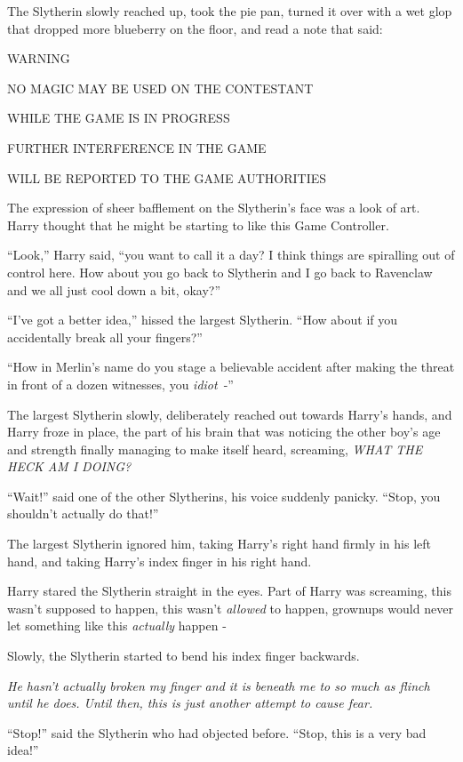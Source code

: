 The Slytherin slowly reached up, took the pie pan, turned it over with a wet glop that dropped more blueberry on the floor, and read a note that said:

WARNING

NO MAGIC MAY BE USED ON THE CONTESTANT

WHILE THE GAME IS IN PROGRESS

FURTHER INTERFERENCE IN THE GAME

WILL BE REPORTED TO THE GAME AUTHORITIES

The expression of sheer bafflement on the Slytherin's face was a look of art. Harry thought that he might be starting to like this Game Controller.

``Look,'' Harry said, ``you want to call it a day? I think things are spiralling out of control here. How about you go back to Slytherin and I go back to Ravenclaw and we all just cool down a bit, okay?''

``I've got a better idea,'' hissed the largest Slytherin. ``How about if you accidentally break all your fingers?''

``How in Merlin's name do you stage a believable accident after making the threat in front of a dozen witnesses, you \emph{idiot}~-''

The largest Slytherin slowly, deliberately reached out towards Harry's hands, and Harry froze in place, the part of his brain that was noticing the other boy's age and strength finally managing to make itself heard, screaming, \emph{WHAT THE HECK AM I DOING?}

``Wait!'' said one of the other Slytherins, his voice suddenly panicky. ``Stop, you shouldn't actually do that!''

The largest Slytherin ignored him, taking Harry's right hand firmly in his left hand, and taking Harry's index finger in his right hand.

Harry stared the Slytherin straight in the eyes. Part of Harry was screaming, this wasn't supposed to happen, this wasn't \emph{allowed} to happen, grownups would never let something like this \emph{actually} happen -

Slowly, the Slytherin started to bend his index finger backwards.

\emph{He hasn't actually broken my finger and it is beneath me to so much as flinch until he does. Until then, this is just another attempt to cause fear.}

``Stop!'' said the Slytherin who had objected before. ``Stop, this is a very bad idea!''

